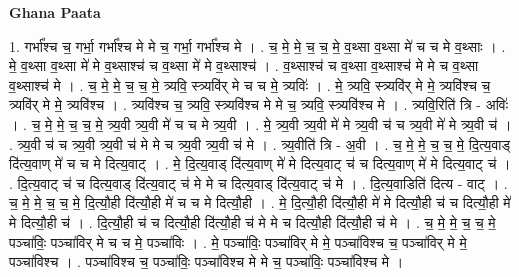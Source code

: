 \documentclass[17pt]{extarticle}
\begin{document}
\textbf{Ghana Paata } \newline

1. गर्भा᳚श्च च॒ गर्भा॒ गर्भा᳚श्च मे मे च॒ गर्भा॒ गर्भा᳚श्च मे । . च॒ मे॒ मे॒ च॒ च॒ मे॒ व॒थ्सा व॒थ्सा मे॑ च च मे व॒थ्साः । . मे॒ व॒थ्सा व॒थ्सा मे॑ मे व॒थ्साश्च॑ च व॒थ्सा मे॑ मे व॒थ्साश्च॑ । . व॒थ्साश्च॑ च व॒थ्सा व॒थ्साश्च॑ मे मे च व॒थ्सा व॒थ्साश्च॑ मे । . च॒ मे॒ मे॒ च॒ च॒ मे॒ त्र्यवि॒ स्त्र्यवि॑र् मे च च मे॒ त्र्यविः॑ । . मे॒ त्र्यवि॒ स्त्र्यवि॑र् मे मे॒ त्र्यवि॑श्च च॒ त्र्यवि॑र् मे मे॒ त्र्यवि॑श्च । . त्र्यवि॑श्च च॒ त्र्यवि॒ स्त्र्यवि॑श्च मे मे च॒ त्र्यवि॒ स्त्र्यवि॑श्च मे । . त्र्यवि॒रिति॑ त्रि - अविः॑ । . च॒ मे॒ मे॒ च॒ च॒ मे॒ त्र्य॒वी त्र्य॒वी मे॑ च च मे त्र्य॒वी । . मे॒ त्र्य॒वी त्र्य॒वी मे॑ मे त्र्य॒वी च॑ च त्र्य॒वी मे॑ मे त्र्य॒वी च॑ । . त्र्य॒वी च॑ च त्र्य॒वी त्र्य॒वी च॑ मे मे च त्र्य॒वी त्र्य॒वी च॑ मे । . त्र्य॒वीति॑ त्रि - अ॒वी । . च॒ मे॒ मे॒ च॒ च॒ मे॒ दि॒त्य॒वाड् दि॑त्य॒वाण् मे॑ च च मे दित्य॒वाट् । . मे॒ दि॒त्य॒वाड् दि॑त्य॒वाण् मे॑ मे दित्य॒वाट् च॑ च दित्य॒वाण् मे॑ मे दित्य॒वाट् च॑ । . दि॒त्य॒वाट् च॑ च दित्य॒वाड् दि॑त्य॒वाट् च॑ मे मे च दित्य॒वाड् दि॑त्य॒वाट् च॑ मे । . दि॒त्य॒वाडिति॑ दित्य - वाट् । . च॒ मे॒ मे॒ च॒ च॒ मे॒ दि॒त्यौ॒ही दि॑त्यौ॒ही मे॑ च च मे दित्यौ॒ही । . मे॒ दि॒त्यौ॒ही दि॑त्यौ॒ही मे॑ मे दित्यौ॒ही च॑ च दित्यौ॒ही मे॑ मे दित्यौ॒ही च॑ । . दि॒त्यौ॒ही च॑ च दित्यौ॒ही दि॑त्यौ॒ही च॑ मे मे च दित्यौ॒ही दि॑त्यौ॒ही च॑ मे । . च॒ मे॒ मे॒ च॒ च॒ मे॒ पञ्चा॑विः॒ पञ्चा॑विर् मे च च मे॒ पञ्चा॑विः । . मे॒ पञ्चा॑विः॒ पञ्चा॑विर् मे मे॒ पञ्चा॑विश्च च॒ पञ्चा॑विर् मे मे॒ पञ्चा॑विश्च । . पञ्चा॑विश्च च॒ पञ्चा॑विः॒ पञ्चा॑विश्च मे मे च॒ पञ्चा॑विः॒ पञ्चा॑विश्च मे । \newline
\end{document}

